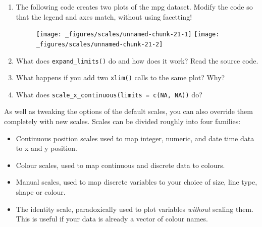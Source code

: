 \begin{enumerate}
\def\labelenumi{\arabic{enumi}.}
\item
  The following code creates two plots of the mpg dataset. Modify the
  code so that the legend and axes match, without using facetting!

\begin{Shaded}
\begin{Highlighting}[]
\StringTok{ }\NormalTok{)}
\StringTok{ }\NormalTok{)}

 \StringTok{ }\NormalTok{()}
 \StringTok{ }\NormalTok{()}
\end{Highlighting}
\end{Shaded}

  \begin{figure}[H]
    \texttt{[image: \_figures/scales/unnamed-chunk-21-1]}%
    \texttt{[image: \_figures/scales/unnamed-chunk-21-2]}
  \end{figure}
\item
  What does \texttt{expand\_limits()} do and how does it work? Read the
  source code.
\item
  What happens if you add two \texttt{xlim()} calls to the same plot?
  Why?
\item
  What does \texttt{scale\_x\_continuous(limits = c(NA, NA))} do?
\end{enumerate}


As well as tweaking the options of the default scales, you can also
override them completely with new scales. Scales can be divided roughly
into four families:

\begin{itemize}
\item
  Continuous position scales used to map integer, numeric, and date time
  data to x and y position.
\item
  Colour scales, used to map continuous and discrete data to colours.
\item
  Manual scales, used to map discrete variables to your choice of size,
  line type, shape or colour.
\item
  The identity scale, paradoxically used to plot variables
  \emph{without} scaling them. This is useful if your data is already a
  vector of colour names.
\end{itemize}

